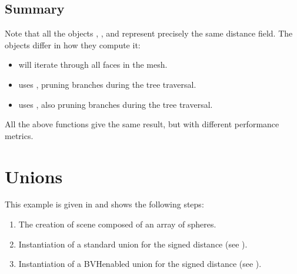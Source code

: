 \documentclass[letterpaper,10pt,english]{sphinxmanual}
\begin{document}
\subsection{Summary}
\label{\detokenize{Example_Basic:summary}}
\sphinxAtStartPar
Note that all the objects , , and  represent precisely the same distance field.
The objects differ in how they compute it:
\begin{itemize}
\item {} 
\sphinxAtStartPar
{} will iterate through all faces in the mesh.

\item {} 
\sphinxAtStartPar
{} uses , pruning branches during the tree traversal.

\item {} 
\sphinxAtStartPar
{} uses , also pruning branches during the tree traversal.

\end{itemize}

\sphinxAtStartPar
All the above functions give the same result, but with different performance metrics.

\sphinxstepscope


\section{Unions}
\label{\detokenize{Example_Union:unions}}\label{\detokenize{Example_Union:chap-exampleunion}}\label{\detokenize{Example_Union::doc}}
\sphinxAtStartPar
This example is given in  and shows the following steps:
\begin{enumerate}
%
\item {} 
\sphinxAtStartPar
The creation of scene composed of an array of spheres.

\item {} 
\sphinxAtStartPar
Instantiation of a standard union for the signed distance (see {\hyperref[\detokenize{ImplemUnion:chap-union}]{}}).

\item {} 
\sphinxAtStartPar
Instantiation of a BVH\sphinxhyphen{}enabled union for the signed distance (see {\hyperref[\detokenize{ImplemUnion:chap-union}]{}}).

\end{enumerate}
\end{document}
